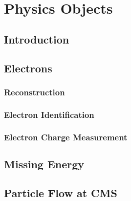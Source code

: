 \chapter{Physics Objects}

\section{Introduction}

\section{Electrons}
\subsection{Reconstruction}
\subsection{Electron Identification}
\subsection{Electron Charge Measurement}

\section{Missing Energy}

\section{Particle Flow at CMS}
